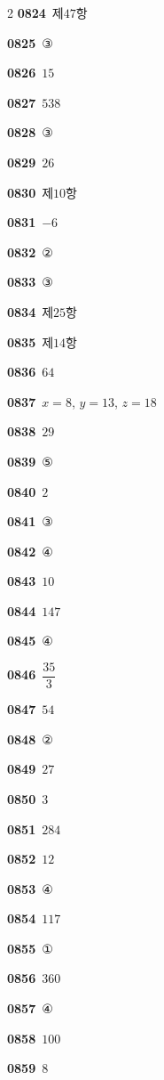\documentclass[10pt,a4paper]{article}
\begin{document}
\begin{multicols}{2}
\noindent\textbf{0824}\ 제$47$항\par
\noindent\textbf{0825}\ ③\par
\noindent\textbf{0826}\ $15$\par
\noindent\textbf{0827}\ $538$\par
\noindent\textbf{0828}\ ③\par
\noindent\textbf{0829}\ $26$\par
\noindent\textbf{0830}\ 제$10$항\par
\noindent\textbf{0831}\ $-6$\par
\noindent\textbf{0832}\ ②\par
\noindent\textbf{0833}\ ③\par
\noindent\textbf{0834}\ 제$25$항\par
\noindent\textbf{0835}\ 제$14$항\par
\noindent\textbf{0836}\ $64$\par
\noindent\textbf{0837}\ $x=8$, $y=13$, $z=18$\par
\noindent\textbf{0838}\ $29$\par
\noindent\textbf{0839}\ ⑤\par
\noindent\textbf{0840}\ $2$\par
\noindent\textbf{0841}\ ③\par
\noindent\textbf{0842}\ ④\par
\noindent\textbf{0843}\ $10$\par
\noindent\textbf{0844}\ $147$\par
\noindent\textbf{0845}\ ④\par
\noindent\textbf{0846}\ $\dfrac{35}{3}$\par
\noindent\textbf{0847}\ $54$\par
\noindent\textbf{0848}\ ②\par
\noindent\textbf{0849}\ $27$\par
\noindent\textbf{0850}\ $3$\par
\noindent\textbf{0851}\ $284$\par
\noindent\textbf{0852}\ $12$\par
\noindent\textbf{0853}\ ④\par
\noindent\textbf{0854}\ $117$\par
\noindent\textbf{0855}\ ①\par
\noindent\textbf{0856}\ $360$\par
\noindent\textbf{0857}\ ④\par
\noindent\textbf{0858}\ $100$\par
\noindent\textbf{0859}\ $8$\par

\end{multicols}
\end{document}
